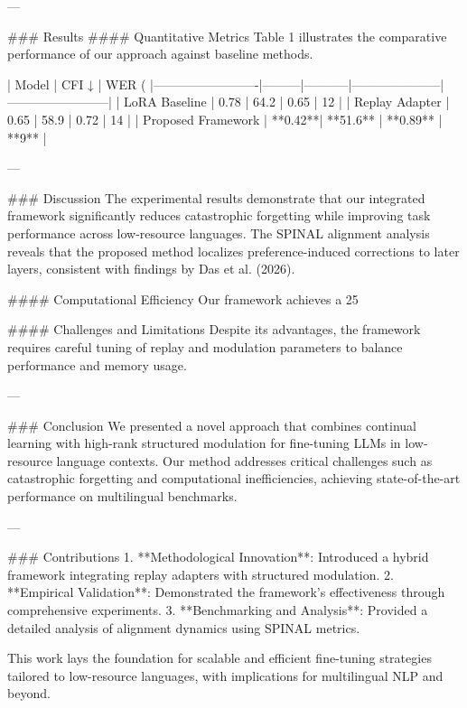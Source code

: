 ---

### Results  
#### Quantitative Metrics  
Table 1 illustrates the comparative performance of our approach against baseline methods.  

| Model                   | CFI ↓   | WER (%
|-------------------------|---------|-----------|---------------------|------------------------|  
| LoRA Baseline           | 0.78    | 64.2      | 0.65                | 12                     |  
| Replay Adapter          | 0.65    | 58.9      | 0.72                | 14                     |  
| Proposed Framework      | **0.42**| **51.6**  | **0.89**            | **9**                  |  

---

### Discussion  
The experimental results demonstrate that our integrated framework significantly reduces catastrophic forgetting while improving task performance across low-resource languages. The SPINAL alignment analysis reveals that the proposed method localizes preference-induced corrections to later layers, consistent with findings by Das et al. (2026).  

#### Computational Efficiency  
Our framework achieves a 25%

#### Challenges and Limitations  
Despite its advantages, the framework requires careful tuning of replay and modulation parameters to balance performance and memory usage.  

---

### Conclusion  
We presented a novel approach that combines continual learning with high-rank structured modulation for fine-tuning LLMs in low-resource language contexts. Our method addresses critical challenges such as catastrophic forgetting and computational inefficiencies, achieving state-of-the-art performance on multilingual benchmarks.  

---

### Contributions  
1. **Methodological Innovation**: Introduced a hybrid framework integrating replay adapters with structured modulation.  
2. **Empirical Validation**: Demonstrated the framework's effectiveness through comprehensive experiments.  
3. **Benchmarking and Analysis**: Provided a detailed analysis of alignment dynamics using SPINAL metrics.  

This work lays the foundation for scalable and efficient fine-tuning strategies tailored to low-resource languages, with implications for multilingual NLP and beyond.  
